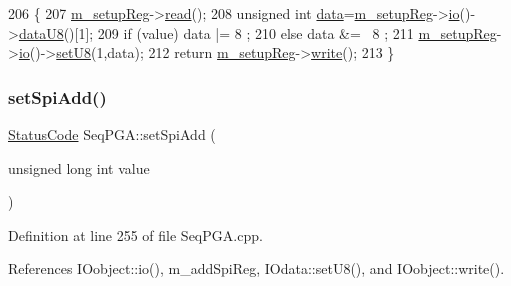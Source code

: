 \begin{DoxyCode}
206                                            \{
207   \hyperlink{classSeqPGA_a03269241e7fc26493cd0595beda334c2}{m\_setupReg}->\hyperlink{classIOobject_aa07610c11963b1db6710e3c76ceea456}{read}();
208   \textcolor{keywordtype}{unsigned} \textcolor{keywordtype}{int} \hyperlink{namespaceshell_a5ea2525995cedc3efd69ea8a7f034d1e}{data}=\hyperlink{classSeqPGA_a03269241e7fc26493cd0595beda334c2}{m\_setupReg}->\hyperlink{classIOobject_af04fb94137c3d86849f478ac5afab5d1}{io}()->\hyperlink{classIOdata_a75e9c318dbac3a39402179070943d4bc}{dataU8}()[1];
209   \textcolor{keywordflow}{if} (value)  data |=  8 ;
210   \textcolor{keywordflow}{else}        data &= ~8 ;
211   \hyperlink{classSeqPGA_a03269241e7fc26493cd0595beda334c2}{m\_setupReg}->\hyperlink{classIOobject_af04fb94137c3d86849f478ac5afab5d1}{io}()->\hyperlink{classIOdata_a6c4fb2f2af01889ada889c2b7aceb24d}{setU8}(1,data);
212   \textcolor{keywordflow}{return} \hyperlink{classSeqPGA_a03269241e7fc26493cd0595beda334c2}{m\_setupReg}->\hyperlink{classIOobject_a9f6984bc9f0fadcf800f1be2523ac744}{write}();
213 \}
\end{DoxyCode}
\mbox{\label{classSeqPGA_ac998ce3a6d9b5f2e88cc8393f8c1df53}} 
\subsubsection{\texorpdfstring{set\+Spi\+Add()}{setSpiAdd()}}
{\footnotesize\ttfamily \hyperlink{classStatusCode}{Status\+Code} Seq\+P\+G\+A\+::set\+Spi\+Add (\begin{DoxyParamCaption}\item[{unsigned long int}]{value }\end{DoxyParamCaption})}



Definition at line 255 of file Seq\+P\+G\+A.\+cpp.



References I\+Oobject\+::io(), m\+\_\+add\+Spi\+Reg, I\+Odata\+::set\+U8(), and I\+Oobject\+::write().



